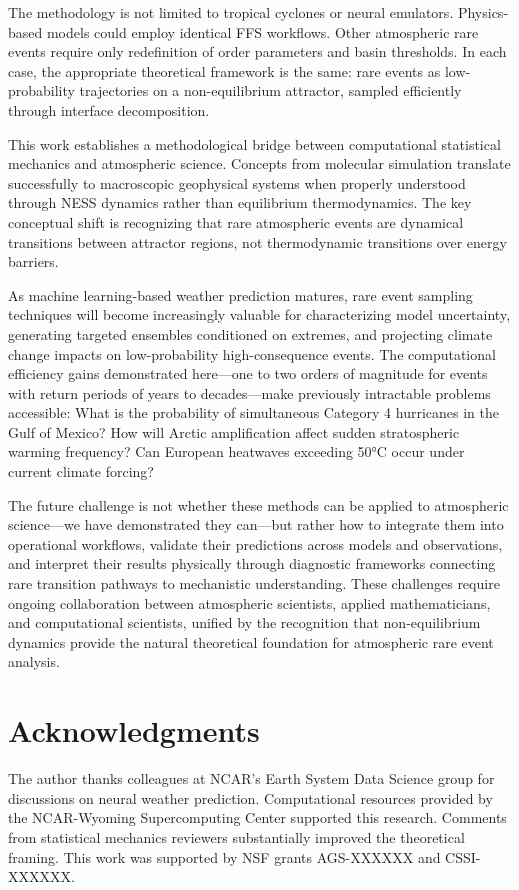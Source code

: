 \documentclass[11pt]{article}
\begin{document}
The methodology is not limited to tropical cyclones or neural emulators. Physics-based models could employ identical FFS workflows. Other atmospheric rare events require only redefinition of order parameters and basin thresholds. In each case, the appropriate theoretical framework is the same: rare events as low-probability trajectories on a non-equilibrium attractor, sampled efficiently through interface decomposition.

This work establishes a methodological bridge between computational statistical mechanics and atmospheric science. Concepts from molecular simulation translate successfully to macroscopic geophysical systems when properly understood through NESS dynamics rather than equilibrium thermodynamics. The key conceptual shift is recognizing that rare atmospheric events are dynamical transitions between attractor regions, not thermodynamic transitions over energy barriers.

As machine learning-based weather prediction matures, rare event sampling techniques will become increasingly valuable for characterizing model uncertainty, generating targeted ensembles conditioned on extremes, and projecting climate change impacts on low-probability high-consequence events. The computational efficiency gains demonstrated here—one to two orders of magnitude for events with return periods of years to decades—make previously intractable problems accessible: What is the probability of simultaneous Category 4 hurricanes in the Gulf of Mexico? How will Arctic amplification affect sudden stratospheric warming frequency? Can European heatwaves exceeding 50°C occur under current climate forcing?

The future challenge is not whether these methods can be applied to atmospheric science—we have demonstrated they can—but rather how to integrate them into operational workflows, validate their predictions across models and observations, and interpret their results physically through diagnostic frameworks connecting rare transition pathways to mechanistic understanding. These challenges require ongoing collaboration between atmospheric scientists, applied mathematicians, and computational scientists, unified by the recognition that non-equilibrium dynamics provide the natural theoretical foundation for atmospheric rare event analysis.


\section*{Acknowledgments}

The author thanks colleagues at NCAR's Earth System Data Science group for discussions on neural weather prediction. Computational resources provided by the NCAR-Wyoming Supercomputing Center supported this research. Comments from statistical mechanics reviewers substantially improved the theoretical framing. This work was supported by NSF grants AGS-XXXXXX and CSSI-XXXXXX.


\end{document}
